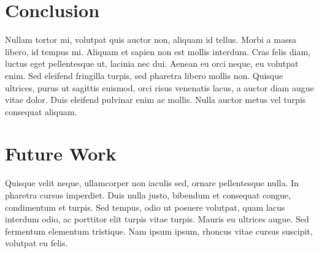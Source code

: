 \documentclass[10pt]{article}
\begin{document}
\begin{multicols}{2}
		
		\section*{Conclusion}
		Nullam tortor mi, volutpat quis auctor non, aliquam id tellus. Morbi a massa libero, id tempus mi. Aliquam et sapien non est mollis interdum. Cras felis diam, luctus eget pellentesque ut, lacinia nec dui. Aenean eu orci neque, eu volutpat enim. Sed eleifend fringilla turpis, sed pharetra libero mollis non. Quisque ultrices, purus ut sagittis euismod, orci risus venenatis lacus, a auctor diam augue vitae dolor. Duis eleifend pulvinar enim ac mollis. Nulla auctor metus vel turpis consequat aliquam.
		
		\section*{Future Work}
		Quisque velit neque, ullamcorper non iaculis sed, ornare pellentesque nulla. In pharetra cursus imperdiet. Duis nulla justo, bibendum et consequat congue, condimentum et turpis. Sed tempus, odio ut posuere volutpat, quam lacus interdum odio, ac porttitor elit turpis vitae turpis. Mauris eu ultrices augue. Sed fermentum elementum tristique. Nam ipsum ipsum, rhoncus vitae cursus suscipit, volutpat eu felis.

	\end{multicols}
\end{document}
